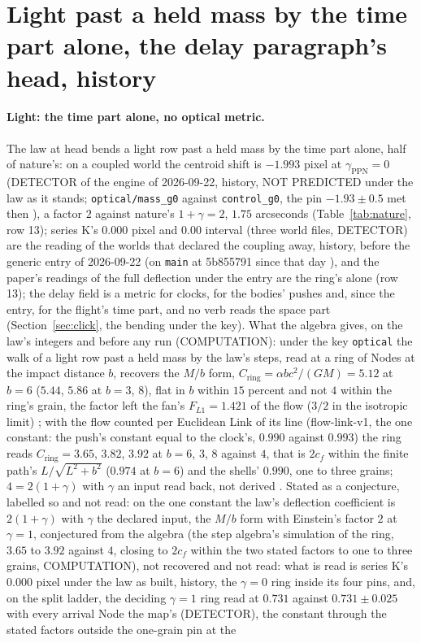 \section{Light past a held mass by the time part alone, the delay paragraph's head, history}\label{rec:olddelayhead}

\paragraph{Light: the time part alone, no optical metric.} The law at head bends a light row past a held mass by the time part alone, half of nature's: on a coupled world the centroid shift is $-1.993$ pixel at $\gamma_{\mathrm{PPN}} = 0$ (DETECTOR of the engine of 2026-09-22, history, NOT PREDICTED under the law as it stands; \texttt{optical/mass\_g0} against \texttt{control\_g0}, the pin $-1.93 \pm 0.5$ met then \cite{disagrees}), a factor $2$ against nature's $1 + \gamma = 2$, $1.75$ arcseconds (Table~\ref{tab:nature}, row 13); series K's $0.000$ pixel and $0.00$ interval (three world files, DETECTOR) are the reading of the worlds that declared the coupling away, history, before the generic entry of 2026-09-22 (on \texttt{main} at 5b855791 since that day \cite{genericentry}), and the paper's readings of the full deflection under the entry are the ring's alone (row 13); the delay field is a metric for clocks, for the bodies' pushes and, since the entry, for the flight's time part, and no verb reads the space part (Section~\ref{sec:click}, the bending under the key).  What the algebra gives, on the law's integers and before any run (COMPUTATION): under the key \texttt{optical} the walk of a light row past a held mass by the law's steps, read at a ring of Nodes at the impact distance $b$, recovers the $M/b$ form, $C_{\mathrm{ring}} = \alpha b c^2/(GM) = 5.12$ at $b = 6$ ($5.44$, $5.86$ at $b = 3$, $8$), flat in $b$ within $15$ percent and not $4$ within the ring's grain, the factor left the fan's $F_{L1} = 1.421$ of the flow ($3/2$ in the isotropic limit) \cite{stepalgebra}; with the flow counted per Euclidean Link of its line (flow-link-v1, the one constant: the push's constant equal to the clock's, $0.990$ against $0.993$) the ring reads $C_{\mathrm{ring}} = 3.65$, $3.82$, $3.92$ at $b = 6$, $3$, $8$ against $4$, that is $2c_f$ within the finite path's $L/\sqrt{L^2 + b^2}$ ($0.974$ at $b = 6$) and the shells' $0.990$, one to three grains; $4 = 2(1 + \gamma)$ with $\gamma$ an input read back, not derived \cite{flowalgebra}. Stated as a conjecture, labelled so and not read: on the one constant the law's deflection coefficient is $2(1 + \gamma)$ with $\gamma$ the declared input, the $M/b$ form with Einstein's factor $2$ at $\gamma = 1$, conjectured from the algebra (the step algebra's simulation of the ring, $3.65$ to $3.92$ against $4$, closing to $2c_f$ within the two stated factors to one to three grains, COMPUTATION), not recovered and not read: what is read is series K's $0.000$ pixel under the law as built, history, the $\gamma = 0$ ring inside its four pins, and, on the split ladder, the deciding $\gamma = 1$ ring read at $0.731$ against $0.731 \pm 0.025$ with every arrival Node the map's (DETECTOR), the constant through the stated factors outside the one-grain pin at the 